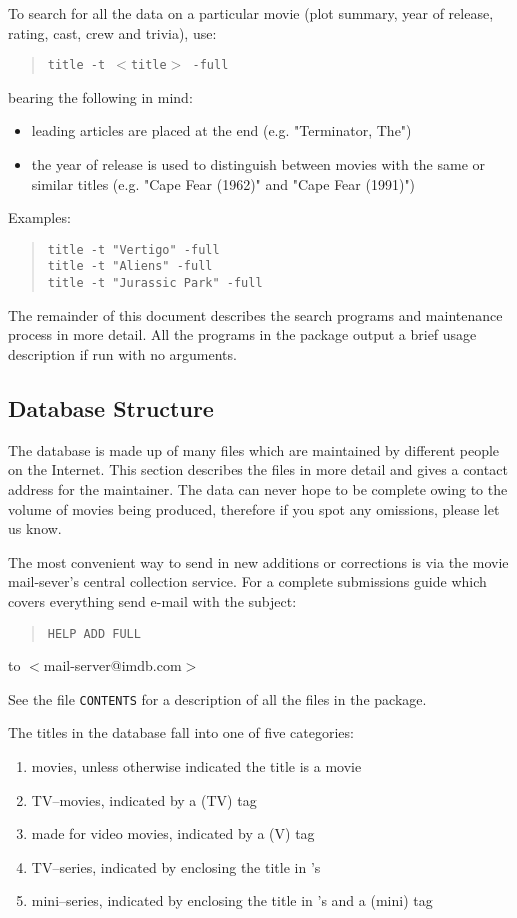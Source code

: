 To search for all the data on a particular movie (plot summary, year of
release, rating, cast, crew and trivia), use:
\begin{quote}
   {\tt title -t $<$title$>$ -full}
\end{quote}
bearing the following in mind:
\begin{itemize}
\item leading articles are placed at the end (e.g. "Terminator, The")
\item the year of release is used to distinguish between movies with the 
same
      or similar titles (e.g. "Cape Fear (1962)" and "Cape Fear (1991)")
\end{itemize}

Examples:
\begin{quote}
   {\tt title -t "Vertigo" -full}\\
   {\tt title -t "Aliens" -full}\\
   {\tt title -t "Jurassic Park" -full}
\end{quote}

The remainder of this document describes the search programs and 
maintenance
process in more detail. All the programs in the package output a brief 
usage 
description if run with no arguments.

\subsection{\label{dbs}Database Structure}

The database is made up of many files which are maintained by different 
people 
on the Internet. This section describes the files in more detail and gives
a contact address for the maintainer. The data can never hope to be 
complete
owing to the volume of movies being produced, therefore if you spot any
omissions, please let us know.

The most convenient way to send in new additions or corrections is via the
movie mail-sever's central collection service. For a complete submissions 
guide which covers everything send e-mail with the subject:
\begin{quote}
{\tt HELP ADD FULL}
\end{quote}
to $<$mail-server@imdb.com$>$ 

See the file {\tt CONTENTS} for a description of all the files in the 
package.

The titles in the database fall into one of five categories:
\begin{enumerate}
\item movies, unless otherwise indicated the title is a movie
\item TV--movies, indicated by a (TV) tag
\item made for video movies, indicated by a (V) tag
\item TV--series, indicated by enclosing the title in 's
\item mini--series, indicated by enclosing the title in 's and a (mini) tag
\end{enumerate}

